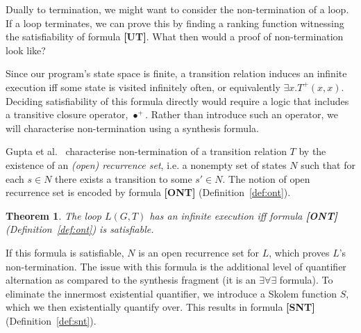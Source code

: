 \documentclass[preprint]{sigplanconf}
\newtheorem{theorem}{Theorem}
\theoremstyle{definition}
\begin{document}
Dually to termination, we might want to consider the non-termination of a loop.  If a loop terminates,
we can prove this by finding a ranking function %
witnessing the satisfiability of formula {\bf[UT]}.  What then would a proof of non-termination look like?

Since our program's state space is finite, a transition relation
induces an infinite execution iff some state is visited infinitely
often, or equivalently $ \exists x . T^+(x, x)$.
Deciding satisfiability of this formula directly would require a logic
that includes a transitive closure operator, $\bullet^+$.  Rather than
introduce such an operator, we will characterise non-termination
using a synthesis formula.

Gupta et al.~\cite{DBLP:conf/popl/GuptaHMRX08} characterise non-termination
of a transition relation $T$ by the existence of an \emph{(open) recurrence
set}, i.e.  a nonempty set of states $N$ such that for each $s \in N$ there
exists a transition to some $s' \in N$.
The notion of open recurrence set is encoded by formula {\bf [ONT]} (Definition~\ref{def:ont}).


\begin{theorem}
\label{thm:ont}
 The loop $L(G, T)$ has an infinite execution iff formula {\bf [ONT]} (Definition~\ref{def:ont}) is satisfiable.
\end{theorem}

%  

If this formula is satisfiable, $N$ is an open recurrence set for $L$, which proves
$L$'s non-termination. The issue with this formula is the additional level of quantifier alternation as compared to the synthesis fragment
(it is an $\exists \forall \exists$ formula).  To eliminate the innermost existential quantifier,
we introduce a Skolem function $S$, which we then existentially quantify over.  This results in
formula {\bf [SNT]} (Definition~\ref{def:snt}).
\end{document}
